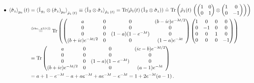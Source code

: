 \documentclass[11pt]{article}
\numberwithin{equation}{section} %
\numberwithin{figure}{section} %
\newcommand\numeq[1] %
  {\stackrel{\scriptscriptstyle(\mkern-1.5mu#1\mkern-1.5mu)}{=}}
\begin{document}
\begin{appendices}
\begin{equation}
\begin{split}
\end{split}
\end{equation}
\begin{equation} \label{sigma_p0(t)}
\begin{split}
 \bullet\,\,\braket{\hat{\sigma}_z}_{p_0}(t)
 &= \braket{\hat{1}_{g_1}\otimes\left(\hat{\sigma}_z\right)_{p_0}}_{\hat{\rho}_1\,(t)}\equiv\braket{\hat{1}_2\otimes\hat{\sigma}_z}_{\hat{\rho}_1\,(t)}=\textrm{Tr}(\hat{\rho}_{1}(t)\,(\hat{1}_2\otimes\hat{\sigma}_z))\doteq \textrm{Tr}\begin{pmatrix}\hat{\rho}_{1}(t)\,\begin{pmatrix}\begin{pmatrix}1&0\\0&1\end{pmatrix}\otimes\begin{pmatrix}1&0\\0&-1\end{pmatrix}\end{pmatrix}\end{pmatrix}\\
 &\numeq{\textrm{\ref{rho_g1(t)}}} \textrm{Tr}\begin{pmatrix}\begin{pmatrix}a&0&0&(b-ic)e^{-\lambda t/2}\\0&0&0&0 \\ 0&0&(1-a)(1-e^{-\lambda t})&0 \\ (b+ic)e^{-\lambda t/2}&0&0&(1-a)e^{-\lambda t} \end{pmatrix}\begin{pmatrix}1&0&0&0\\0&-1&0&0\\0&0&1&0\\0&0&0&-1\end{pmatrix}\end{pmatrix}\\
 &=\textrm{Tr}\begin{pmatrix}a&0&0&(ic-b)e^{-\lambda t/2}\\0&0&0&0 \\ 0&0&(1-a)(1-e^{-\lambda t})&0 \\ (b+ic)e^{-\lambda t/2}&0&0&(a-1)e^{-\lambda t} \end{pmatrix}\\
 &=a+1-e^{-\lambda t}-a+ae^{-\lambda t}+ae^{-\lambda t}-e^{-\lambda t}=1+2e^{-\lambda t}(a-1)\,\textrm{.}
\end{split}
\end{equation}





\end{appendices}
\end{document}

